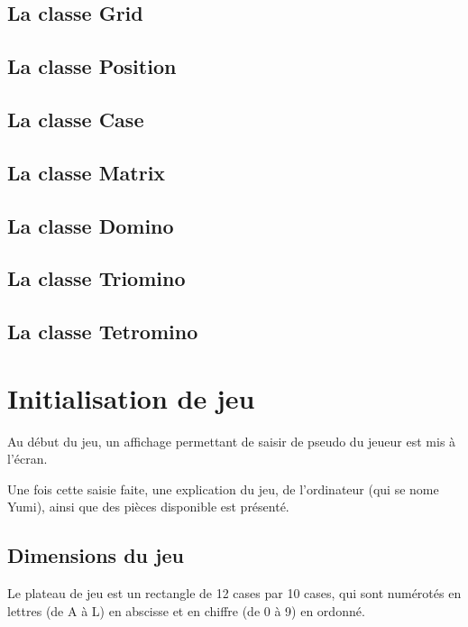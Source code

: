 \documentclass[a4paper, titlepage, french]{report}
\begin{document}
\section{La classe Grid}
\bigskip

\section{La classe Position}
\bigskip

\section{La classe Case}
\bigskip

\section{La classe Matrix}
\bigskip

\section{La classe Domino}
\bigskip

\section{La classe Triomino}
\bigskip

\section{La classe Tetromino}
\bigskip

\chapter{Initialisation de jeu}

Au début du jeu, un affichage permettant de saisir de pseudo du jeueur est mis à l'écran.

Une fois cette saisie faite, une explication du jeu, de l'ordinateur (qui se nome Yumi), ainsi que des pièces disponible est présenté.



\section{Dimensions du jeu}

Le plateau de jeu est un rectangle de 12 cases par 10 cases, qui sont numérotés en lettres (de A à L) en abscisse et en chiffre (de 0 à 9) en ordonné.
\end{document}
